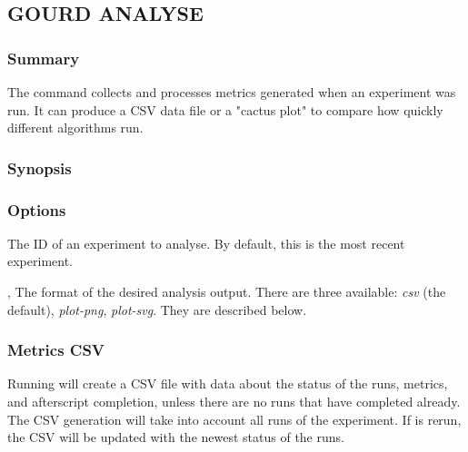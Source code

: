 \documentclass[a4paper,english]{article}
\begin{document}
\begin{adjustwidth}{18pt}{0pt}
        \subsection{GOURD ANALYSE}

            \subsubsection{Summary}
                The   command collects and processes metrics generated
                when an experiment was run. It can produce a CSV data file or a "cactus plot" 
                to compare how quickly different algorithms run.

            \subsubsection{Synopsis}
                 

            \subsubsection{Options}
                \begin{Description}[Options]
                  \item[\Arg{experiment-id}]
                    The ID of an experiment to analyse.
                    By default, this is the most recent experiment.
                  \item[\OptArg{-o}{ format}, \OptArg{--output}{ format}]
                    The format of the desired analysis output. There are three available:
                    \emph{csv} (the default), \emph{plot-png}, \emph{plot-svg}. They are described below.
                \end{Description}

            \subsubsection{Metrics CSV}
                Running    will create a CSV file with
                data about the status of the runs, metrics, and afterscript completion, unless there
                are no runs that have completed already.
                The CSV generation will take into account all runs of the experiment. If 
                 is rerun, the CSV will be updated with the newest status of the runs.


\end{adjustwidth}
\end{document}
